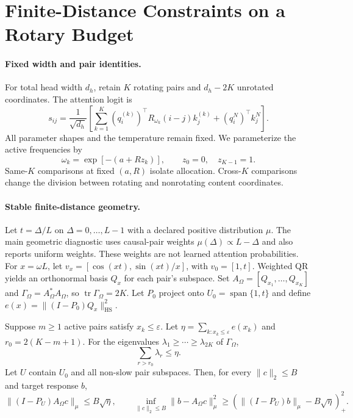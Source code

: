 \section{Finite-Distance Constraints on a Rotary Budget}
\label{sec:budget-new}

\paragraph{Fixed width and pair identities.}
For total head width $d_h$, retain $K$ rotating pairs and $d_h-2K$ unrotated
coordinates. The attention logit is
\begin{equation}
s_{ij}=\frac{1}{\sqrt{d_h}}\left[
\sum_{k=1}^{K}(q_i^{(k)})^\top R_{\omega_k}(i-j)k_j^{(k)}
+(q_i^N)^\top k_j^N\right].
\end{equation}
All parameter shapes and the temperature remain fixed. We parameterize the
active frequencies by
\begin{equation}
\omega_k=\exp[-(a+Rz_k)],\qquad z_0=0,\quad z_{K-1}=1.
\label{eq:table-decomposition}
\end{equation}
Same-$K$ comparisons at fixed $(a,R)$ isolate allocation. Cross-$K$ comparisons
change the division between rotating and nonrotating content coordinates.

\paragraph{Stable finite-distance geometry.}
Let $t=\Delta/L$ on $\Delta=0,\ldots,L-1$ with a declared positive distribution
$\mu$. The main geometric diagnostic uses causal-pair weights
$\mu(\Delta)\propto L-\Delta$ and also reports uniform weights. These weights
are not learned attention probabilities. For $x=\omega L$, let
$v_x=[\cos(xt),\sin(xt)/x]$, with $v_0=[1,t]$.
Weighted QR yields an orthonormal basis $Q_x$ for each pair's subspace. Set
$A_\Omega=[Q_{x_1},\ldots,Q_{x_K}]$ and
$\Gamma_\Omega=A_\Omega^*A_\Omega$, so $\operatorname{tr}\Gamma_\Omega=2K$.
Let $P_0$ project onto $U_0=\operatorname{span}\{1,t\}$ and define
$e(x)=\|(I-P_0)Q_x\|_{\mathrm{HS}}^2$.

\begin{proposition}
\label{prop:finite-budget}
Suppose $m\ge1$ active pairs satisfy $x_k\le\varepsilon$. Let
$\eta=\sum_{k:x_k\le\varepsilon}e(x_k)$ and $r_0=2(K-m+1)$.
For the eigenvalues $\lambda_1\ge\cdots\ge\lambda_{2K}$ of $\Gamma_\Omega$,
\begin{equation}
\sum_{r>r_0}\lambda_r\le\eta.
\label{eq:tail-budget}
\end{equation}
Let $U$ contain $U_0$ and all non-slow pair subspaces. Then, for every
$\|c\|_2\le B$ and target response $b$,
\begin{equation}
\|(I-P_U)A_\Omega c\|_\mu\le B\sqrt\eta,\qquad
\inf_{\|c\|_2\le B}\|b-A_\Omega c\|_\mu^2
\ge(\|(I-P_U)b\|_\mu-B\sqrt\eta)_+^2.
\label{eq:bounded-response}
\end{equation}
\end{proposition}


